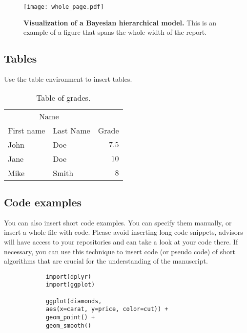 \documentclass[fleqn,moreauthors,10pt]{ds_report}
\begin{document}
		\begin{figure*}[ht]\centering 
			\texttt{[image: whole\_page.pdf]}
			\caption{\textbf{Visualization of a Bayesian hierarchical model.} This is an example of a figure that spans the whole width of the report.}
			\label{fig:whole}
		\end{figure*}
		
		
		\subsection*{Tables}
		
		Use the table environment to insert tables.
		
		\begin{table}[hbt]
			\caption{Table of grades.}
			\centering
			\begin{tabular}{l l | r}
				\toprule
				\multicolumn{2}{c}{Name} \\
				\cmidrule(r){1-2}
				First name & Last Name & Grade \\
				\midrule
				John & Doe & $7.5$ \\
				Jane & Doe & $10$ \\
				Mike & Smith & $8$ \\
				\bottomrule
			\end{tabular}
			\label{tab:label}
		\end{table}
		
		
		\subsection*{Code examples}
		
		You can also insert short code examples. You can specify them manually, or insert a whole file with code. Please avoid inserting long code snippets, advisors will have access to your repositories and can take a look at your code there. If necessary, you can use this technique to insert code (or pseudo code) of short algorithms that are crucial for the understanding of the manuscript.
		
		\lstset{language=Python}
		
		
		\lstset{language=R}
		\begin{lstlisting}
			import(dplyr)
			import(ggplot)
			
			ggplot(diamonds,
			aes(x=carat, y=price, color=cut)) +
			geom_point() +
			geom_smooth()
		\end{lstlisting}
		
\end{document}
